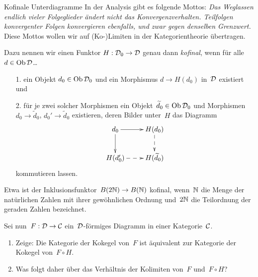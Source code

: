 \documentclass{pizzablatt}
\begin{document}
\begin{aufgabe}{Kofinale Unterdiagramme}\small
In der Analysis gibt es folgende Mottos: \emph{Das Weglassen endlich vieler Folgeglieder
ändert nicht das Konvergenzverhalten. Teilfolgen konvergenter Folgen
konvergieren ebenfalls, und zwar gegen denselben Grenzwert.} Diese Mottos
wollen wir auf (Ko-)Limiten in der Kategorientheorie übertragen.

Dazu nennen wir einen Funktor $H : \mathcal{D}_0 \to \mathcal{D}$ genau dann \emph{kofinal}, wenn
für alle~$d \in \operatorname{Ob}\mathcal{D}$\ldots
\begin{enumerate}
\item[1.] ein Objekt $d_0 \in \operatorname{Ob}\mathcal{D}_0$ und ein Morphismus $d \to
H(d_0)$ in~$\mathcal{D}$ existiert und
\item[2.] für je zwei solcher Morphismen ein Objekt~$\widetilde d_0 \in \operatorname{Ob}\mathcal{D}_0$ und
Morphismen $d_0 \to \widetilde d_0$, $d_0' \to \widetilde d_0$ existieren, deren Bilder
unter~$H$ das Diagramm
\[ \xymatrix{
  d_0 \ar[r] \ar[d] & H(d_0) \ar@{-->}[d] \\
  H(d_0') \ar@{-->}[r] & H(\widetilde d_0)
} \]
kommutieren lassen.
\end{enumerate}
Etwa ist der Inklusionsfunktor~$B (2\mathbb{N}) \to B(\mathbb{N})$ kofinal, wenn~$\mathbb{N}$ die
Menge der natürlichen Zahlen mit ihrer gewöhnlichen Ordnung und~$2\mathbb{N}$ die
Teilordnung der geraden Zahlen bezeichnet.

Sei nun~$F : \mathcal{D} \to \mathcal{C}$ ein~$\mathcal{D}$-förmiges Diagramm in einer Kategorie~$\mathcal{C}$.
\begin{enumerate}
\item
Zeige: Die Kategorie der Kokegel von~$F$ ist äquivalent zur Kategorie der
Kokegel von~$F \circ H$.
\item Was folgt daher über das Verhältnis der Kolimiten von~$F$ und~$F \circ
H$?
\end{enumerate}
\end{aufgabe}
\end{document}
